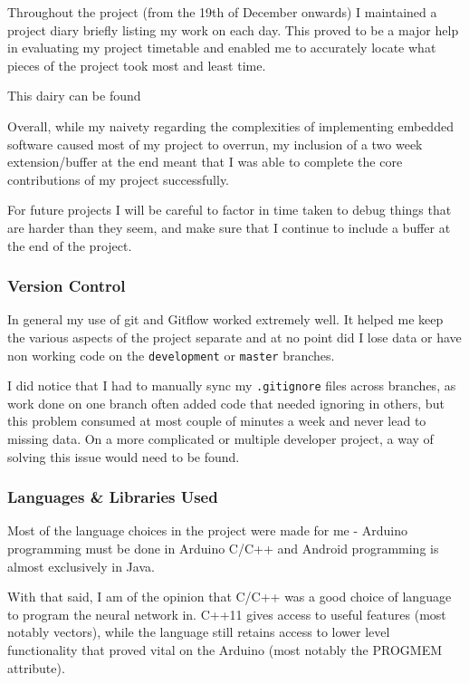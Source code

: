 \documentclass[a4paper]{article}
\begin{document}

Throughout the project (from the 19th of December onwards) I maintained a project diary briefly listing my work on each day. This proved to be a major help in evaluating my project timetable and enabled me to accurately locate what pieces of the project took most and least time.

This dairy can be found 

Overall, while my naivety regarding the complexities of implementing embedded software caused most of my project to overrun, my inclusion of a two week extension/buffer at the end meant that I was able to complete the core contributions of my project successfully. 

For future projects I will be careful to factor in time taken to debug things that are harder than they seem, and make sure that I continue to include a buffer at the end of the project.

\subsubsection{Version Control}

In general my use of git and Gitflow worked extremely well. It helped me keep the various aspects of the project separate and at no point did I lose data or have non working code on the \lstinline{development} or \lstinline{master} branches. 

I did notice that I had to manually sync my \lstinline{.gitignore} files across branches, as work done on one branch often added code that needed ignoring in others, but this problem consumed at most couple of minutes a week and never lead to missing data. On a more complicated or multiple developer project, a way of solving this issue would need to be found.

\subsubsection{Languages \& Libraries Used}

Most of the language choices in the project were made for me - Arduino programming must be done in Arduino C/C++ and Android programming is almost exclusively in Java. 

With that said, I am of the opinion that C/C++ was a good choice of language to program the neural network in. C++11 gives access to useful features (most notably vectors), while the language still retains access to lower level functionality that proved vital on the Arduino (most notably the PROGMEM attribute).
\end{document}
